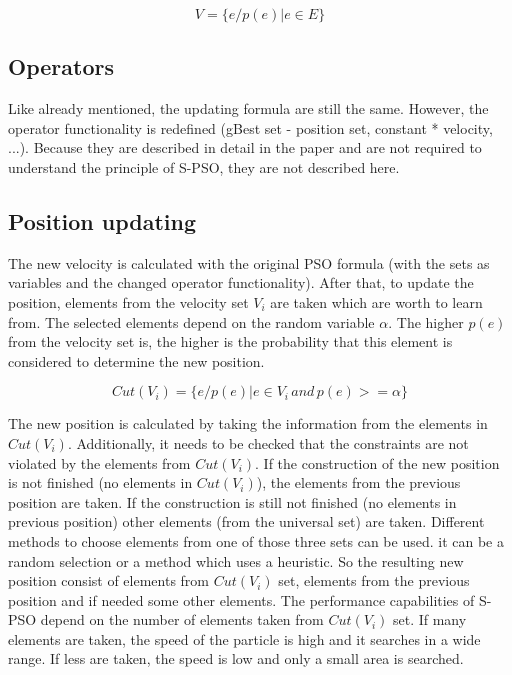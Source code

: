 \documentclass{article}
\begin{document}
\begin{equation}
V = \{e/p(e)| e \in E\}
\end{equation}

\subsection{Operators}
Like already mentioned, the updating formula are still the same. However, the operator functionality is redefined (gBest set - position set, constant * velocity, ...). Because they are described in detail in the paper and are not required to understand the principle of S-PSO, they are not described here.

\subsection{Position updating}
The new velocity is calculated with the original PSO formula (with the sets as variables and the changed operator functionality). After that, to update the position, elements from the velocity set $V_i$ are taken which are worth to learn from. The selected elements depend on the random variable $\alpha$. The higher $p(e)$ from the velocity set is, the higher is the probability that this element is considered to determine the new position.

\begin{equation}
Cut(V_i) = \{e/p(e)| e \in V_i \, and \, p(e) >= \alpha\}
\end{equation}

The new position is calculated by taking the information from the elements in $Cut(V_i)$. Additionally, it needs to be checked that the constraints are not violated by the elements from $Cut(V_i)$. If the construction of the new position is not finished (no elements in $Cut(V_i)$), the elements from the previous position are taken. If the construction is still not finished (no elements in previous position) other elements (from the universal set) are taken. Different methods to choose elements from one of those three sets can be used. it can be a random selection or a method which uses a heuristic. So the resulting new position consist of elements from $Cut(V_i)$ set, elements from the previous position and if needed some other elements. The performance capabilities of S-PSO depend on the number of elements taken from $Cut(V_i)$ set. If many elements are taken, the speed of the particle is high and it searches in a wide range. If less are taken, the speed is low and only a small area is searched.
\end{document}

